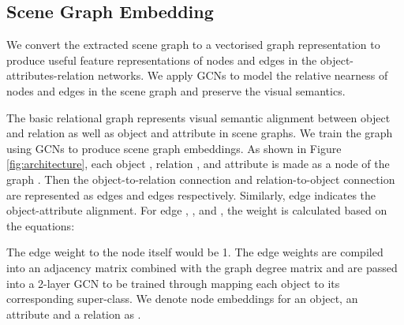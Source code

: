 \documentclass[11pt]{article}
\begin{document}
\subsection{Scene Graph Embedding}
We convert the extracted scene graph to a vectorised graph representation to produce useful feature representations of nodes and edges in the object-attributes-relation networks. We apply GCNs to model the relative nearness of nodes and edges in the scene graph and preserve the visual semantics.

The basic relational graph  represents visual semantic alignment between object and relation as well as object and attribute in scene graphs. We train the graph using GCNs to produce scene graph embeddings. As shown in Figure \ref{fig:architecture}, each object , relation , and attribute  is made as a node of the graph . Then the object-to-relation connection and relation-to-object connection are represented as edges  and edges  respectively. Similarly, edge  indicates the object-attribute alignment. For edge , , and , the weight is calculated based on the equations:



The edge weight to the node itself would be 1. The edge weights are compiled into an adjacency matrix combined with the graph degree matrix and are passed into a 2-layer GCN to be trained through mapping each object to its corresponding super-class. We denote node embeddings for an object, an attribute and a relation as .
\end{document}
